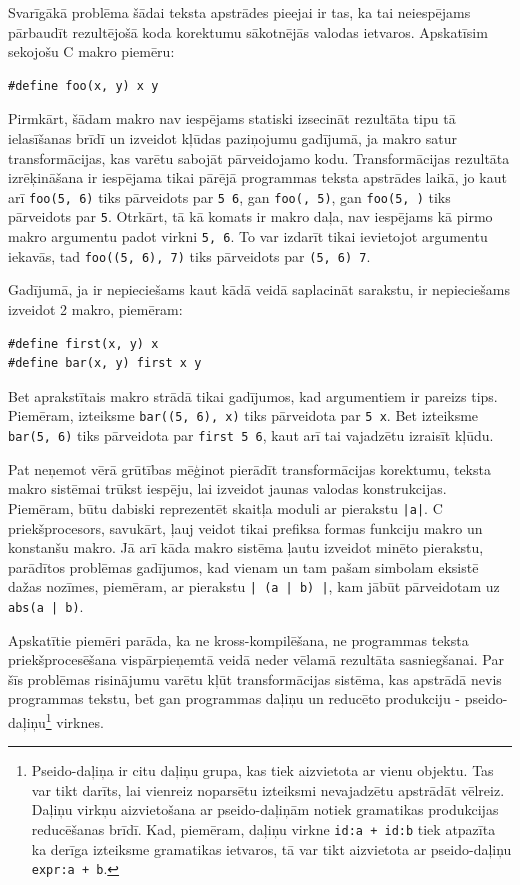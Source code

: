Svarīgākā problēma šādai teksta apstrādes pieejai ir tas, ka tai neiespējams pārbaudīt rezultējošā koda korektumu sākotnējās valodas ietvaros. Apskatīsim sekojošu C makro piemēru:
\begin{verbatim}
#define foo(x, y) x y
\end{verbatim}

Pirmkārt, šādam makro nav iespējams statiski izsecināt rezultāta tipu tā ielasīšanas brīdī un izveidot kļūdas paziņojumu gadījumā, ja makro satur transformācijas, kas varētu sabojāt pārveidojamo kodu. Transformācijas rezultāta izrēķināšana ir iespējama tikai pārējā programmas teksta apstrādes laikā, jo kaut arī \verb|foo(5, 6)| tiks pārveidots par \verb|5 6|, gan \verb|foo(, 5)|, gan \verb|foo(5, )| tiks pārveidots par \verb|5|. Otrkārt, tā kā komats ir makro daļa, nav iespējams kā pirmo makro argumentu padot virkni \verb|5, 6|. To var izdarīt tikai ievietojot argumentu iekavās, tad \verb|foo((5, 6), 7)| tiks pārveidots par \verb|(5, 6) 7|.

Gadījumā, ja ir nepieciešams kaut kādā veidā saplacināt sarakstu, ir nepieciešams izveidot 2 makro, piemēram:
\begin{verbatim}
#define first(x, y) x
#define bar(x, y) first x y
\end{verbatim}

Bet aprakstītais makro strādā tikai gadījumos, kad argumentiem ir pareizs tips. Piemēram, izteiksme \verb|bar((5, 6), x)| tiks pārveidota par \verb|5 x|. Bet izteiksme \verb|bar(5, 6)| tiks pārveidota par \verb|first 5 6|, kaut arī tai vajadzētu izraisīt kļūdu. 


Pat neņemot vērā grūtības mēģinot pierādīt transformācijas korektumu, teksta makro sistēmai trūkst iespēju, lai izveidot jaunas valodas konstrukcijas. Piemēram, būtu dabiski reprezentēt skaitļa moduli ar pierakstu \verb/|a|/. C priekšprocesors, savukārt, ļauj veidot tikai prefiksa formas funkciju makro un konstanšu makro. Jā arī kāda makro sistēma ļautu izveidot minēto pierakstu, parādītos problēmas gadījumos, kad vienam un tam pašam simbolam eksistē dažas nozīmes, piemēram, ar pierakstu \verb/| (a | b) |/, kam jābūt pārveidotam uz \verb/abs(a | b)/.

Apskatītie piemēri parāda, ka ne kross-kompilēšana, ne programmas teksta priekšprocesēšana vispārpieņemtā veidā neder vēlamā rezultāta sasniegšanai. Par šīs problēmas risinājumu varētu kļūt transformācijas sistēma, kas apstrādā nevis programmas tekstu, bet gan programmas daļiņu un reducēto produkciju - pseido-daļiņu\footnote{Pseido-daļiņa ir citu daļiņu grupa, kas tiek aizvietota ar vienu objektu. Tas var tikt darīts, lai vienreiz noparsētu izteiksmi nevajadzētu apstrādāt vēlreiz. Daļiņu virkņu aizvietošana ar pseido-daļiņām notiek gramatikas produkcijas reducēšanas brīdī. Kad, piemēram, daļiņu virkne \texttt{{id:a} {+} {id:b}} tiek atpazīta ka derīga izteiksme gramatikas ietvaros, tā var tikt aizvietota ar pseido-daļiņu \texttt{{expr:a + b}}.} virknes. 

